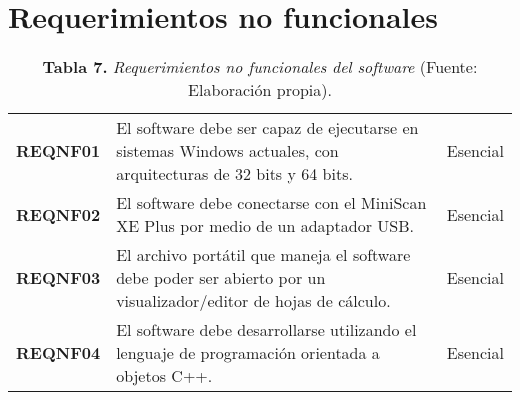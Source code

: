\section{Requerimientos no funcionales}
\FloatBarrier
\vline
	\begin{table}[htb]
		\small
		\caption{\textbf{Tabla 7.} \textit{Requerimientos no funcionales del software} (Fuente: Elaboraci\'{o}n propia).}
		\centering
		\setlength{\extrarowheight}{5pt}
		\begin{tabulary}{15.5cm}{|c|L|c|}
			\hline
			 &  & \\ \hline
			\textbf{REQNF01} & El software debe ser capaz de ejecutarse en sistemas Windows actuales, con arquitecturas de 32 bits y 64 bits. & Esencial\\ \hline
			\textbf{REQNF02} & El software debe conectarse con el MiniScan XE Plus por medio de un adaptador USB. & Esencial\\ \hline
			\textbf{REQNF03} & El archivo port\'{a}til que maneja el software debe poder ser abierto por un visualizador/editor de hojas de c\'{a}lculo. & Esencial\\ \hline
			\textbf{REQNF04} & El software debe desarrollarse utilizando el lenguaje de programaci\'{o}n orientada a objetos C++. & Esencial\\ \hline
		\end{tabulary}
	\end{table}
\FloatBarrier %